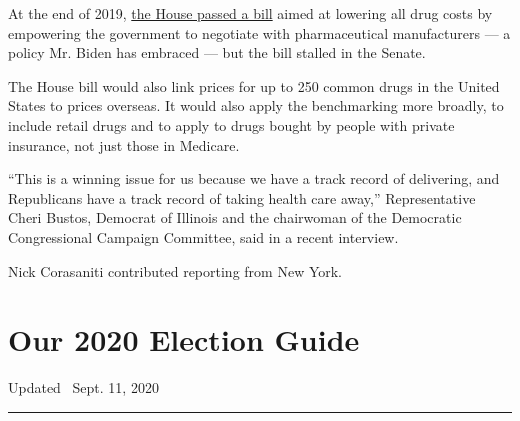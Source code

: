 At the end of 2019,
\href{https://www.nytimes3xbfgragh.onion/2019/12/12/us/politics/house-prescription-drug-prices.html}{the
House passed a bill} aimed at lowering all drug costs by empowering the
government to negotiate with pharmaceutical manufacturers --- a policy
Mr. Biden has embraced --- but the bill stalled in the Senate.

The House bill would also link prices for up to 250 common drugs in the
United States to prices overseas. It would also apply the benchmarking
more broadly, to include retail drugs and to apply to drugs bought by
people with private insurance, not just those in Medicare.

``This is a winning issue for us because we have a track record of
delivering, and Republicans have a track record of taking health care
away,'' Representative Cheri Bustos, Democrat of Illinois and the
chairwoman of the Democratic Congressional Campaign Committee, said in a
recent interview.

Nick Corasaniti contributed reporting from New York.

\hypertarget{our-2020-election-guide}{%
\section{Our 2020 Election Guide}\label{our-2020-election-guide}}

Updated ~Sept. 11, 2020

\begin{center}\rule{0.5\linewidth}{\linethickness}\end{center}

